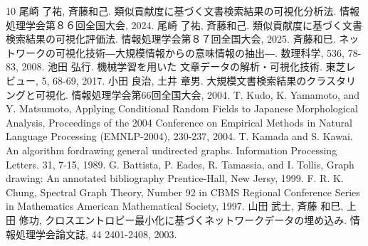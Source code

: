 \documentclass[a4j,fleqn,10pt]{jarticle}
\begin{document}
\fontsize{9.5pt}{0pt}\selectfont
\begin{thebibliography}{10}
尾崎 了祐, 斉藤和己.
類似貢献度に基づく文書検索結果の可視化分析法.
情報処理学会第８６回全国大会, 2024. 
尾崎 了祐, 斉藤和己.
類似貢献度に基づく文書検索結果の可視化評価法.
情報処理学会第８７回全国大会, 2025. 
斉藤和巳.
ネットワークの可視化技術―大規模情報からの意味情報の抽出―.
数理科学, 536, 78-83, 2008.
池田 弘行.
機械学習を用いた 文章データの解析・可視化技術.
東芝レビュー, 5, 68-69, 2017. 
小田 良治, 土井 章男.
大規模文書検索結果のクラスタリングと可視化.
情報処理学会第66回全国大会, 2004. 
T. Kudo, K. Yamamoto, and Y. Matsumoto, 
Applying Conditional Random Fields to Japanese Morphological Analysis, 
Proceedings of the 2004 Conference on Empirical Methods in Natural Language Processing (EMNLP-2004), 230-237, 2004.
T. Kamada and S. Kawai. 
An algorithm fordrawing general undirected graphs. 
Information Processing Letters. 31, 7-15, 1989.
G. Battista, P. Eades, R. Tamassia, and I. Tollis, 
Graph drawing: An annotated bibliography Prentice-Hall, New Jersy, 1999.
F. R. K. Chung,
Spectral Graph Theory, Number 92 in CBMS Regional Conference Series 
in Mathematics American Mathematical Society, 1997. 
山田 武士, 斉藤 和巳, 上田 修功, クロスエントロピー最小化に基づくネットワークデータの埋め込み.
情報処理学会論文誌, 44 2401-2408, 2003.

\end{thebibliography}
\end{document}
